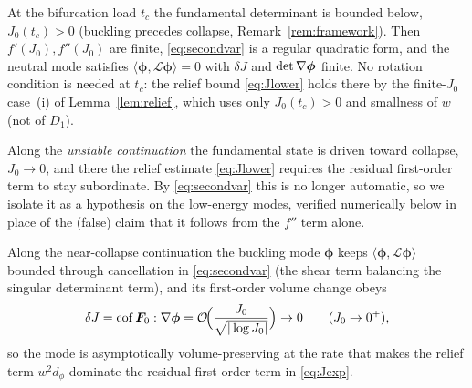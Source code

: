 \begin{lemma}
    \label{lem:rotreg}
    At the bifurcation load $t_c$ the fundamental determinant is bounded below, $J_0(t_c)>0$ (buckling precedes
    collapse, Remark~\ref{rem:framework}). Then $f'(J_0),f''(J_0)$ are finite, \eqref{eq:secondvar} is a regular
    quadratic form, and the neutral mode satisfies $\langle\bm{\phi},\mathcal{L}\bm{\phi}\rangle=0$ with $\delta J$ and
    $\det\nabla\bm{\phi}$ finite. No rotation condition is needed at $t_c$: the relief bound \eqref{eq:Jlower} holds there
    by the finite-$J_0$ case~(i) of Lemma~\ref{lem:relief}, which uses only $J_0(t_c)>0$ and smallness of $w$ (not of
    $D_1$).
\end{lemma}

\noindent Along the \emph{unstable continuation} the fundamental state is driven toward collapse, $J_0\to0$, and there
the relief estimate \eqref{eq:Jlower} requires the residual first-order term to stay subordinate. By
\eqref{eq:secondvar} this is no longer automatic, so we isolate it as a hypothesis on the low-energy modes, verified
numerically below in place of the (false) claim that it follows from the $f''$ term alone.

\begin{assumption}
    \label{ass:rot}
    Along the near-collapse continuation the buckling mode $\bm{\phi}$ keeps $\langle\bm{\phi},\mathcal{L}\bm{\phi}\rangle$
    bounded through cancellation in \eqref{eq:secondvar} (the shear term balancing the singular determinant term), and
    its first-order volume change obeys
    \begin{equation}
        \label{eq:rotrate}
        \delta J=\operatorname{cof}\bm{F}_0:\nabla\bm{\phi}
        = \mathcal{O}\!\Big(\frac{J_0}{\sqrt{|\log J_0|}}\Big) \to 0 \qquad (J_0\to0^+),
    \end{equation}
    so the mode is asymptotically volume-preserving at the rate that makes the relief term $w^2 d_\phi$ dominate the
    residual first-order term in \eqref{eq:Jexp}.
\end{assumption}

